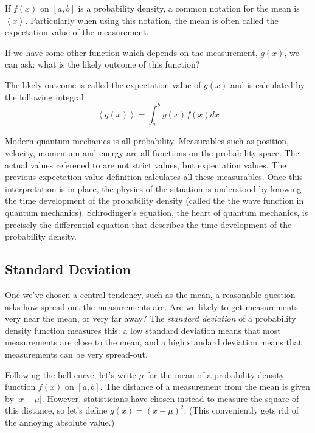 \documentclass[fleqn]{report}
\begin{document}
If $f(x)$ on $[a,b]$ is a probability density, a common
notation for the mean is $\left<x\right>$. Particularly when
using this notation, the mean is often called the expectation
value of the measurement. 

If we have some other function which depends on the
measurement, $g(x)$, we can ask: what is the likely
outcome of this function? 

\begin{defn} 
The likely outcome is called the expectation value of $g(x)$
and is calculated by the following integral.
\begin{equation*}
\left<g(x)\right> = \int_a^b g(x) f(x) dx 
\end{equation*}
\end{defn}

Modern quantum mechanics is all probability. Measurables such
as position, velocity, momentum and energy are all functions
on the probability space. The actual values referened to are
not strict values, but expectation values. The previous
expectation value definition calculates all these measurables.
Once this interpretation is in place, the physics of the
situation is understood by knowing the time development of the
probability density (called the the wave function in quantum
mechanics). Schrodinger's equation, the heart of quantum
mechanics, is precisely the differential equation that
describes the time development of the probability density.

\subsection{Standard Deviation}
\label{standard-deviation}

One we've chosen a central tendency, such as the mean, a
reasonable question asks how spread-out the 
measurements are. Are we likely to get measurements very
near the mean, or very far away? The \emph{standard
deviation} of a probability density function measures this: a
low standard deviation means that most measurements are close
to the mean, and a high standard deviation means that
measurements can be very spread-out.

Following the bell curve, let's write $\mu$ for the mean of a
probability density function $f(x)$ on $[a,b]$. The distance
of a measurement from the mean is given by $|x-\mu|$.
However, statisticians have chosen instead to measure the
square of this distance, so let's define $g(x) = (x-\mu)^2$.
(This conveniently gets rid of the annoying absolute value.) 
\end{document}
